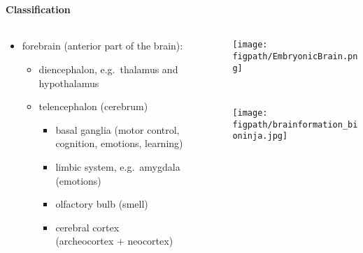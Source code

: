 \documentclass[8pt,t,usepdftitle=false]{beamer}
\def\figpath{\src/figures}
\begin{document}
\section{\ttl}
\begin{frame}[plain,t]
  \frametitle{\ttl}
  \framesubtitle{Classification}
  \begin{columns}
    \begin{column}{0.5\linewidth}
      \begin{itemize}
        \itemsep1ex
      \item forebrain (anterior part of the brain): 
        \begin{itemize}\itemsep1ex
        \item diencephalon, e.g.~thalamus and hypothalamus
        \item telencephalon (cerebrum)
          \begin{itemize}
          \item basal ganglia
            (motor control, cognition, emotions, learning)
          \item limbic system, e.g.~amygdala (emotions)
          \item olfactory bulb (smell)
          \item cerebral cortex\\ (archeocortex + \alert{neocortex})
          \end{itemize}
        \end{itemize}
      \end{itemize}      
    \end{column}
    \begin{column}{0.5\linewidth}
      \begin{center}
        \vspace*{-1cm}
      \parbox{0.8\linewidth}{
        \texttt{[image: \\figpath/EmbryonicBrain.png]}\\
        \hspace*{\fill}\tiny\color{gray}{(Embryonic vertebrate brain; Wikipedia)}
      }\\[1ex]
      \parbox{0.9\linewidth}{
        \texttt{[image: \\figpath/brainformation\_bioninja.jpg]}\\
        \hspace*{\fill}\tiny{}
      }%
      \end{center}
    \end{column}
  \end{columns}
\end{frame}
\end{document}
